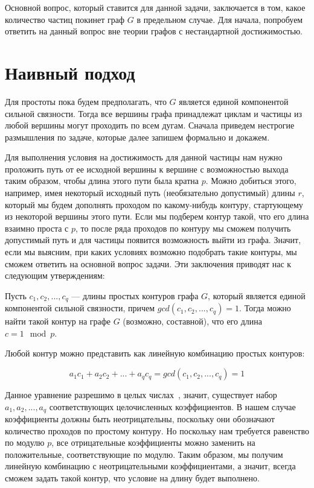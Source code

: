 	Основной вопрос, который ставится для данной задачи, заключается в том, какое количество частиц покинет граф $G$ в предельном случае. Для начала, попробуем ответить на данный вопрос вне теории графов с нестандартной достижимостью. 
	
	\section{Наивный подход}
	
	Для простоты пока будем предполагать, что $G$ является единой компонентой сильной связности. Тогда все вершины графа принадлежат циклам и частицы из любой вершины могут проходить по всем дугам. Сначала приведем нестрогие размышления по задаче, которые далее запишем формально и докажем. 
	
	Для выполнения условия на достижимость для данной частицы нам нужно проложить путь от ее исходной вершины к вершине с возможностью выхода таким образом, чтобы длина этого пути была кратна $p$. Можно добиться этого, например, имея некоторый исходный путь (необязательно допустимый) длины $r$, который мы будем дополнять проходом по какому-нибудь контуру, стартующему из некоторой вершины этого пути. Если мы подберем контур такой, что его длина взаимно проста с $p$, то после ряда проходов по контуру мы сможем получить допустимый путь и для частицы появится возможность выйти из графа. Значит, если мы выясним, при каких условиях возможно подобрать такие контуры, мы сможем ответить на основной вопрос задачи. Эти заключения приводят нас к следующим утверждениям:
	
	\begin{mylemma}
		Пусть $c_1, c_2, ... , c_q $ --- длины простых контуров графа $G$, который является единой компонентой сильной связности, причем $gcd(c_1, c_2, ... , c_q) = 1$. Тогда можно найти такой контур на графе $G$ (возможно, составной), что его длина $c = 1\mod p$.
	\end{mylemma}
	
	\begin{myproof}
		Любой контур можно представить как линейную комбинацию простых контуров: 
		
		\begin{equation*}
		a_1c_1 + a_2c_2 + ... + a_qc_q = gcd(c_1, c_2, ... , c_q) = 1
		\end{equation*}
		
		Данное уравнение разрешимо в целых числах~\autocite{Hasse}, значит, существует набор $a_1, a_2, ... , a_q$ соответствующих целочисленных коэффициентов. В нашем случае коэффициенты должны быть неотрицательны, поскольку они обозначают количество проходов по простому контуру. Но поскольку нам требуется равенство по модулю $p$, все отрицательные коэффициенты можно заменить на положительные, соответствующие по модулю. Таким образом, мы получим линейную комбинацию с неотрицательными коэффициентами, а значит, всегда сможем задать такой контур, что условие на длину будет выполнено. 
	\end{myproof}

